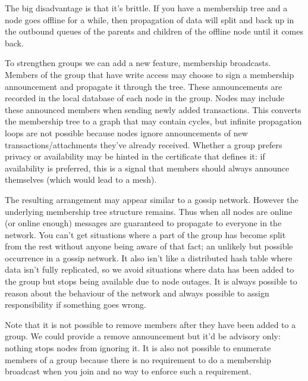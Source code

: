 \documentclass{article}
\begin{document}
The big disadvantage is that it's brittle. If you have a membership tree and a node goes offline for a while, then
propagation of data will split and back up in the outbound queues of the parents and children of the offline node
until it comes back.

To strengthen groups we can add a new feature, membership broadcasts. Members of the group that have write access
may choose to sign a membership announcement and propagate it through the tree. These announcements are recorded in
the local database of each node in the group. Nodes may include these announced members when sending newly added
transactions. This converts the membership tree to a graph that may contain cycles, but infinite propagation loops
are not possible because nodes ignore announcements of new transactions/attachments they've already received.
Whether a group prefers privacy or availability may be hinted in the certificate that defines it: if availability
is preferred, this is a signal that members should always announce themselves (which would lead to a mesh).

The resulting arrangement may appear similar to a gossip network. However the underlying membership tree structure
remains. Thus when all nodes are online (or online enough) messages are guaranteed to propagate to everyone in the
network. You can't get situations where a part of the group has become split from the rest without anyone being
aware of that fact; an unlikely but possible occurrence in a gossip network. It also isn't like a distributed hash
table where data isn't fully replicated, so we avoid situations where data has been added to the group but stops
being available due to node outages. It is always possible to reason about the behaviour of the network and always
possible to assign responsibility if something goes wrong.

Note that it is not possible to remove members after they have been added to a group. We could provide a remove
announcement but it'd be advisory only: nothing stops nodes from ignoring it. It is also not possible to enumerate
members of a group because there is no requirement to do a membership broadcast when you join and no way to enforce
such a requirement.

\end{document}
